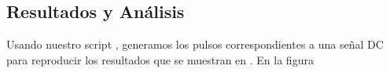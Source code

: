 \documentclass[twoside]{article}
\begin{document}
\begin{multicols}{2}
\section{Resultados y Análisis}

Usando nuestro script \cite{script}, generamos los pulsos correspondientes a una señal DC para reproducir los resultados que se muestran en \cite{aziz1996}. En la figura 

\end{multicols}





\nocite{*} %
\end{document}
